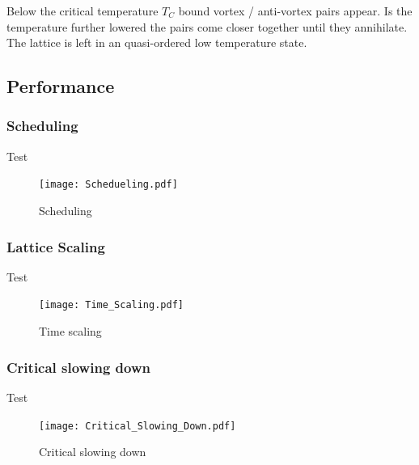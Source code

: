Below the critical temperature $T_C$ bound vortex / anti-vortex pairs appear. Is the temperature further lowered the pairs come closer together until they annihilate. The lattice is left in an quasi-ordered low temperature state.

\subsection{Performance}
\subsubsection{Scheduling}
Test
\begin{figure}
	\centering
	\texttt{[image: Schedueling.pdf]}
	\caption{Scheduling}
\end{figure}

\subsubsection{Lattice Scaling}
Test
\begin{figure}
	\centering
	\texttt{[image: Time\_Scaling.pdf]}
	\caption{Time scaling}
\end{figure}

\subsubsection{Critical slowing down}
Test
\begin{figure}
	\centering
	\texttt{[image: Critical\_Slowing\_Down.pdf]}
	\caption{Critical slowing down}
\end{figure}
